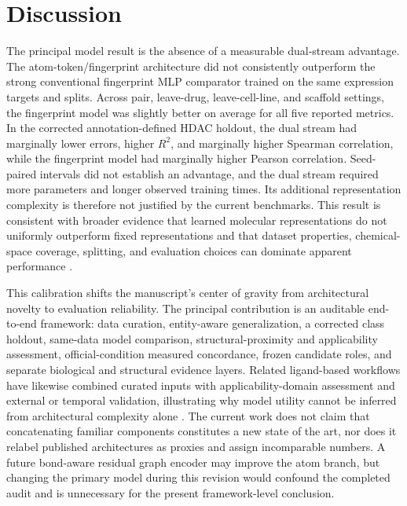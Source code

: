 \section{Discussion}

\begin{roundtworevision}
The principal model result is the absence of a measurable dual-stream advantage. The atom-token/fingerprint architecture did not consistently outperform the strong conventional fingerprint MLP comparator trained on the same expression targets and splits. Across pair, leave-drug, leave-cell-line, and scaffold settings, the fingerprint model was slightly better on average for all five reported metrics. In the corrected annotation-defined HDAC holdout, the dual stream had marginally lower errors, higher $R^2$, and marginally higher Spearman correlation, while the fingerprint model had marginally higher Pearson correlation. Seed-paired intervals did not establish an advantage, and the dual stream required more parameters and longer observed training times. Its additional representation complexity is therefore not justified by the current benchmarks. This result is consistent with broader evidence that learned molecular representations do not uniformly outperform fixed representations and that dataset properties, chemical-space coverage, splitting, and evaluation choices can dominate apparent performance \cite{deng2023systematic}.
\end{roundtworevision}

\begin{roundtworevision}
This calibration shifts the manuscript's center of gravity from architectural novelty to evaluation reliability. The principal contribution is an auditable end-to-end framework: data curation, entity-aware generalization, a corrected class holdout, same-data model comparison, structural-proximity and applicability assessment, official-condition measured concordance, frozen candidate roles, and separate biological and structural evidence layers. Related ligand-based workflows have likewise combined curated inputs with applicability-domain assessment and external or temporal validation, illustrating why model utility cannot be inferred from architectural complexity alone \cite{delre2022herg,delre2023alpaca}. The current work does not claim that concatenating familiar components constitutes a new state of the art, nor does it relabel published architectures as proxies and assign incomparable numbers. A future bond-aware residual graph encoder may improve the atom branch, but changing the primary model during this revision would confound the completed audit and is unnecessary for the present framework-level conclusion.
\end{roundtworevision}

